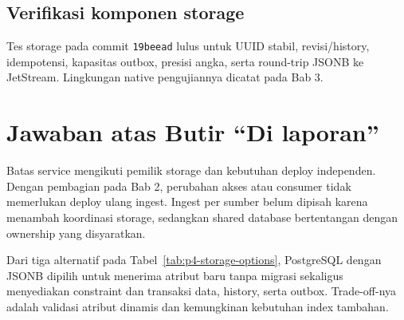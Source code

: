 \subsection{Verifikasi komponen storage}
Tes storage pada commit \texttt{19beead} lulus untuk UUID stabil, revisi/history, idempotensi, kapasitas outbox, presisi angka, serta round-trip JSONB ke JetStream. Lingkungan native pengujiannya dicatat pada Bab 3.

\section{Jawaban atas Butir ``Di laporan''}
\label{sec:p4-di-laporan}
Batas service mengikuti pemilik storage dan kebutuhan deploy independen. Dengan pembagian pada Bab 2, perubahan akses atau consumer tidak memerlukan deploy ulang ingest. Ingest per sumber belum dipisah karena menambah koordinasi storage, sedangkan shared database bertentangan dengan ownership yang disyaratkan.

Dari tiga alternatif pada Tabel~\ref{tab:p4-storage-options}, PostgreSQL dengan JSONB dipilih untuk menerima atribut baru tanpa migrasi sekaligus menyediakan constraint dan transaksi data, history, serta outbox. Trade-off-nya adalah validasi atribut dinamis dan kemungkinan kebutuhan index tambahan.
